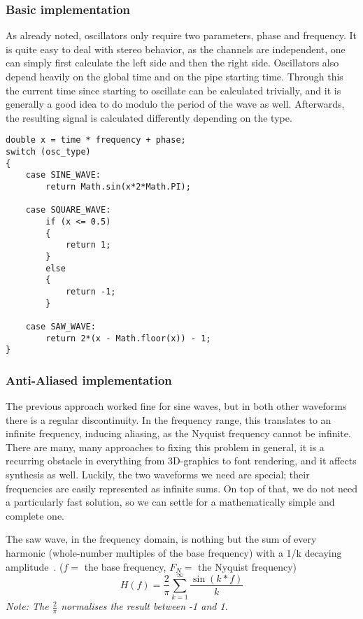 \documentclass[11pt,a4paper]{article}
\begin{document}
\subsubsection{Basic implementation}

As already noted, oscillators only require two parameters, phase and frequency. It is quite easy to deal with stereo behavior, as the channels are independent, one can simply first calculate the left side and then the right side. Oscillators also depend heavily on the global time and on the pipe starting time. Through this the current time since starting to oscillate can be calculated trivially, and it is generally a good idea to do modulo the period of the wave as well. Afterwards, the resulting signal is calculated differently depending on the type.
\\\begin{minipage}{\linewidth}
\begin{lstlisting}
double x = time * frequency + phase;
switch (osc_type)
{
	case SINE_WAVE:
		return Math.sin(x*2*Math.PI);

	case SQUARE_WAVE:
		if (x <= 0.5)
		{
		    return 1;
		}
		else
		{
		    return -1;
		}

	case SAW_WAVE:
		return 2*(x - Math.floor(x)) - 1;
}
\end{lstlisting}
\end{minipage}

\subsubsection{Anti-Aliased implementation}

The previous approach worked fine for sine waves, but in both other waveforms there is a regular discontinuity. In the frequency range, this translates to an infinite frequency, inducing aliasing, as the Nyquist frequency cannot be infinite.
There are many, many approaches to fixing this problem in general, it is a recurring obstacle in everything from 3D-graphics to font rendering, and it affects synthesis as well. Luckily, the two waveforms we need are special; their frequencies are easily represented as infinite sums. On top of that, we do not need a particularly fast solution, so we can settle for a mathematically simple and complete one.

The saw wave, in the frequency domain, is nothing but the sum of every harmonic (whole-number multiples of the base frequency) with a 1/k decaying amplitude~\cite{WolframSaw}.
(\(f = \) the base frequency, \(F_N = \) the Nyquist frequency)
\begin{equation}
H(f) = \frac{2}{\pi}\sum\limits_{k=1}^\infty{\frac{\sin(k*f)}{k}}
\end{equation}
{\small \it Note: The \(\frac{2}{\pi}\) normalises the result between -1 and 1.}
\end{document}
